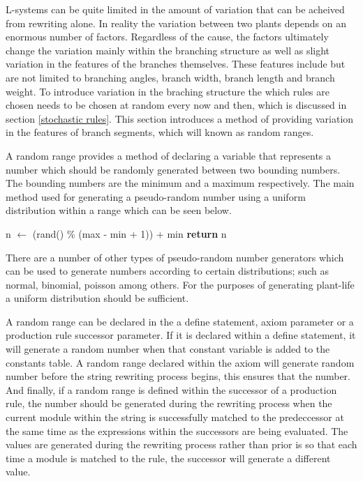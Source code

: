 L-systems can be quite limited in the amount of variation that can be acheived from rewriting alone. In reality the variation between two plants depends on an enormous number of factors. Regardless of the cause, the factors ultimately change the variation mainly within the branching structure as well as slight variation in the features of the branches themselves. These features include but are not limited to branching angles, branch width, branch length and branch weight. To introduce variation in the braching structure the which rules are chosen needs to be chosen at random every now and then, which is discussed in section \ref{stochastic rules}. This section introduces a method of providing variation in the features of branch segments, which will known as random ranges. 

A random range provides a method of declaring a variable that represents a number which should be randomly generated between two bounding numbers. The bounding numbers are the minimum and a maximum respectively. The main method used for generating a pseudo-random number using a uniform distribution within a range which can be seen below. 

\begin{singlespace}
\begin{algorithm}
\begin{algorithmic}[1]
	\State n $\gets$ (rand() \% (max - min + 1)) + min
	\State \textbf{return} n
\EndProcedure
\end{algorithmic}
\end{algorithm}
\end{singlespace}

\noindent
There are a number of other types of pseudo-random number generators which can be used to generate numbers according to certain distributions; such as normal, binomial, poisson among others. For the purposes of generating plant-life a uniform distribution should be sufficient.

A random range can be declared in the a define statement, axiom parameter or a production rule successor parameter. If it is declared within a define statement, it will generate a random number when that constant variable is added to the constants table. A random range declared within the axiom will generate random number before the string rewriting process begins, this ensures that the number. And finally, if a random range is defined within the successor of a production rule, the number should be generated during the rewriting process when the current module within the string is successfully matched to the predeccessor at the same time as the expressions within the successors are being evaluated. The values are generated during the rewriting process rather than prior is so that each time a module is matched to the rule, the successor will generate a different value. 


